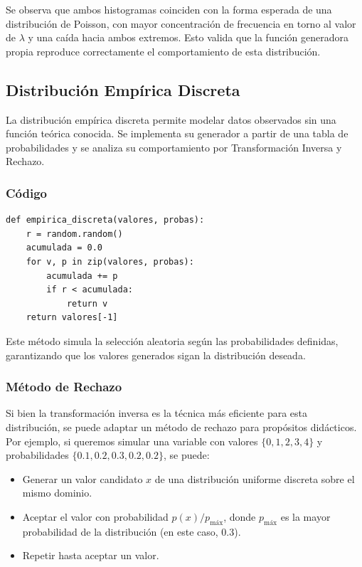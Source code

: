 \documentclass{article}
\begin{document}
Se observa que ambos histogramas coinciden con la forma esperada de una distribución de Poisson, con mayor concentración de frecuencia en torno al valor de $\lambda$ y una caída hacia ambos extremos. Esto valida que la función generadora propia reproduce correctamente el comportamiento de esta distribución.


\subsection{Distribución Empírica Discreta}
La distribución empírica discreta permite modelar datos observados sin una función teórica conocida. Se implementa su generador a partir de una tabla de probabilidades y se analiza su comportamiento por Transformación Inversa y Rechazo.

\subsubsection{Código}
\begin{verbatim}
def empirica_discreta(valores, probas):
    r = random.random()
    acumulada = 0.0
    for v, p in zip(valores, probas):
        acumulada += p
        if r < acumulada:
            return v
    return valores[-1]
\end{verbatim}

Este método simula la selección aleatoria según las probabilidades definidas, garantizando que los valores generados sigan la distribución deseada.

\subsubsection{Método de Rechazo}
Si bien la transformación inversa es la técnica más eficiente para esta distribución, se puede adaptar un método de rechazo para propósitos didácticos. Por ejemplo, si queremos simular una variable con valores $\{0, 1, 2, 3, 4\}$ y probabilidades $\{0.1, 0.2, 0.3, 0.2, 0.2\}$, se puede:

\begin{itemize}
    \item Generar un valor candidato $x$ de una distribución uniforme discreta sobre el mismo dominio.
    \item Aceptar el valor con probabilidad $p(x) / p_{\text{máx}}$, donde $p_{\text{máx}}$ es la mayor probabilidad de la distribución (en este caso, $0.3$).
    \item Repetir hasta aceptar un valor.
\end{itemize}
\end{document}
